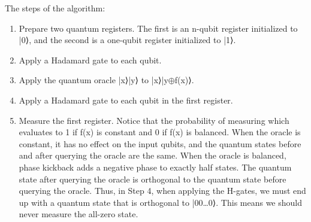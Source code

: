 \documentclass{article}
\begin{document}
The steps of the algorithm:
\begin{enumerate}[start=1]
\item Prepare two quantum registers. The first is an n-qubit register initialized to |0⟩, and the second is a one-qubit register initialized to |1⟩.
\item Apply a Hadamard gate to each qubit.
\item Apply the quantum oracle |x⟩|y⟩ to |x⟩|y$\oplus$f(x)⟩.
\item Apply a Hadamard gate to each qubit in the first register.
\item Measure the first register. Notice that the probability of measuring which evaluates to 1 if f(x) is constant and 0 if f(x) is balanced.
\newline
When the oracle is constant, it has no effect on the input qubits, and the quantum states before and after querying the oracle are the same. 
When the oracle is balanced, phase kickback adds a negative phase to exactly half states.
The quantum state after querying the oracle is orthogonal to the quantum state before querying the oracle. Thus, in Step 4, when applying the H-gates, we must end up with a quantum state that is orthogonal to |00…0⟩. This means we should never measure the all-zero state.
\end{enumerate}
\newpage
\end{document}
